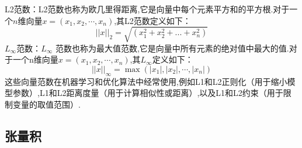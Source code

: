 \documentclass{book}
\begin{document}
L2范数：L2范数也称为欧几里得距离,它是向量中每个元素平方和的平方根.对于一个$n$维向量$x = (x_1, x_2,\cdots, x_n)$,其L2范数定义如下：
\begin{equation}
    ||x||_2 = \sqrt{(x_1^2 + x_2^2 + ... + x_n^2)}
\end{equation}
$L_\infty$范数：$L_\infty$ 范数也称为最大值范数,它是向量中所有元素的绝对值中最大的值.对于一个n维向量$x = (x_1, x_2,\cdots, x_n)$,其$L_\infty$定义如下：
\begin{equation}
    ||x||_\infty = \max(|x_1|, |x_2|,\cdots, |x_n|)
\end{equation}
这些向量范数在机器学习和优化算法中经常使用,例如L1和L2正则化（用于缩小模型参数）,L1和L2距离度量（用于计算相似性或距离）,以及L1和L2约束（用于限制变量的取值范围）.
\subsection{张量积}
\end{document}
